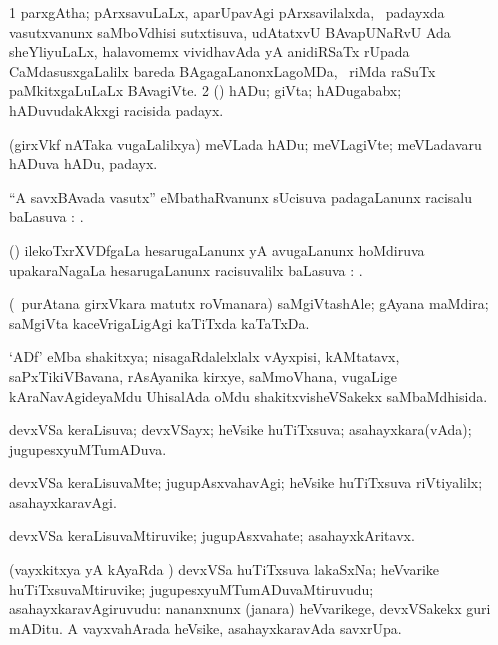\bentry
{}
\gl{\nA}
\bmng
\bnum
\num{1} parxgAtha; pArxsavuLaLx, aparUpavAgi pArxsavilalxda, \sA\ padayxda vasutxvanunx saMboVdhisi sutxtisuva, udAtatxvU BAvapUNaRvU Ada sheYliyuLaLx, halavomemx vividhavAda yA anidiRSaTx rUpada CaMdasusxgaLalilx bareda BAgagaLanonxLagoMDa, \sA\ riMda raSuTx paMkitxgaLuLaLx BAvagiVte. 
\num{2} (\ca) hADu; giVta; hADugababx; hADuvudakAkxgi racisida padayx. 
\enum
\emng

\noindent
\gl{\pagu}
\bmng
{} (girxVkf nATaka \mo vugaLalilxya) meVLada hADu; meVLagiVte; meVLadavaru hADuva hADu, padayx. 
\emng
\eentry

\bentry
{}
\gl{\uparx}
\bmng
``A savxBAvada vasutx'' eMbathaRvanunx sUcisuva padagaLanunx racisalu baLasuva \uparx: . 
\emng
\eentry

\bentry
{}
\gl{\saupa}
\bmng
(\viduyx) ilekoTxrXVDfgaLa hesarugaLanunx yA avugaLanunx hoMdiruva upakaraNagaLa hesarugaLanunx racisuvalilx baLasuva \saupa: . 
\emng
\eentry

\bentry
{}
\gl{\nA}
\bmng
(\kanmu\ purAtana girxVkara matutx roVmanara) saMgiVtashAle; gAyana maMdira; saMgiVta kaceVrigaLigAgi kaTiTxda kaTaTxDa. 
\emng
\eentry

\bentry
{}
\gl{\gu}
\bmng
`ADf' eMba shakitxya; nisagaRdalelxlalx vAyxpisi, kAMtatavx, saPxTikiVBavana, rAsAyanika kirxye, saMmoVhana, \mo vugaLige kAraNavAgideyaMdu UhisalAda oMdu shakitxvisheVSakekx saMbaMdhisida. 
\emng
\eentry

\bentry
{}
\gl{\gu}
\bmng
devxVSa keraLisuva; devxVSayx; heVsike huTiTxsuva; asahayxkara(vAda); jugupesxyuMTumADuva. 
\emng
\eentry

\bentry
{}
\gl{\kirxvi}
\bmng
devxVSa keraLisuvaMte; jugupAsxvahavAgi; heVsike huTiTxsuva riVtiyalilx; asahayxkaravAgi. 
\emng
\eentry

\bentry
{}
\gl{\nA}
\bmng
devxVSa keraLisuvaMtiruvike; jugupAsxvahate; asahayxkAritavx. 
\emng
\eentry

\bentry
{}
\gl{\nA}
\bmng
(vayxkitxya yA kAyaRda \vi) devxVSa huTiTxsuva lakaSxNa; heVvarike huTiTxsuvaMtiruvike; jugupesxyuMTumADuvaMtiruvudu; asahayxkaravAgiruvudu:  nananxnunx (janara) heVvarikege, devxVSakekx guri mADitu.  A vayxvahArada heVsike, asahayxkaravAda savxrUpa. 
\emng
\eentry

